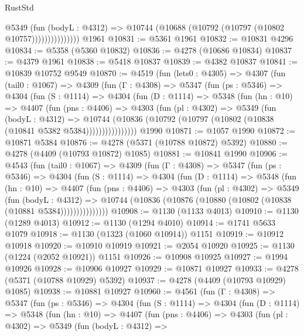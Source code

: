 \begin{lexlean}{RustStd}
\begin{coremodule}
                      @5349
                        (fun (bodyL : @4312) =>
                        @10744 (@10688 (@10792 (@10797 (@10802 @10757)))))))))))))))
    @1961
@10831 := @5361 @1961
@10832 := @10831 @4296
@10834 := @5358 (@5360 @10832)
@10836 := @4278 (@10686 @10834)
@10837 := @4379 @1961
@10838 := @5418 @10837
@10839 := @4382 @10837
@10841 := @10839 @10752 @9549
@10870 := @4519
    (fun (lets0 : @4305) =>
    @4307
      (fun (tail0 : @1067) =>
      @4309
        (fun (Γ : @4308) =>
        @5347
          (fun (ps : @5346) =>
          @4304
            (fun (S : @1114) =>
            @4304
              (fun (D : @1114) =>
              @5348
                (fun (hn : @10) =>
                @4407
                  (fun (pns : @4406) =>
                  @4303
                    (fun (pl : @4302) =>
                    @5349
                      (fun (bodyL : @4312) =>
                      @10744
                        (@10836 (@10792 (@10797 (@10802 (@10838 (@10841 @5382 @5384))))))))))))))))
    @1990
@10871 := @1057 @1990
@10872 := @10871 @5384
@10876 := @4278 (@5371 (@10788 @10872) @5392)
@10880 := @4278 (@4409 (@10793 @10872) @1085)
@10881 := @10841 @1990
@10906 := @4543
    (fun (tail0 : @1067) =>
    @4309
      (fun (Γ : @4308) =>
      @5347
        (fun (ps : @5346) =>
        @4304
          (fun (S : @1114) =>
          @4304
            (fun (D : @1114) =>
            @5348
              (fun (hn : @10) =>
              @4407
                (fun (pns : @4406) =>
                @4303
                  (fun (pl : @4302) =>
                  @5349
                    (fun (bodyL : @4312) =>
                    @10744 (@10836 (@10876 (@10880 (@10802 (@10838 (@10881 @5384)))))))))))))))
@10908 := @1130 (@1133 @4013)
@10910 := @1130 (@1289 @4013)
@10912 := @1130 (@1294 @4010)
@10914 := @1741 @5633 @1079
@10918 := @1130 (@1323 (@1060 @10914)) @1151
@10919 := @10912 @10918
@10920 := @10910 @10919
@10921 := @2054 @10920
@10925 := @1130 (@1224 (@2052 @10921)) @1151
@10926 := @10908 @10925
@10927 := @1994 @10926
@10928 := @10906 @10927
@10929 := @10871 @10927
@10933 := @4278 (@5371 (@10788 @10929) @5392)
@10937 := @4278 (@4409 (@10793 @10929) @1085)
@10938 := @10881 @10927
@10960 := @4561
    (fun (Γ : @4308) =>
    @5347
      (fun (ps : @5346) =>
      @4304
        (fun (S : @1114) =>
        @4304
          (fun (D : @1114) =>
          @5348
            (fun (hn : @10) =>
            @4407
              (fun (pns : @4406) =>
              @4303
                (fun (pl : @4302) =>
                @5349
                  (fun (bodyL : @4312) =>

\end{coremodule}
\end{lexlean}
